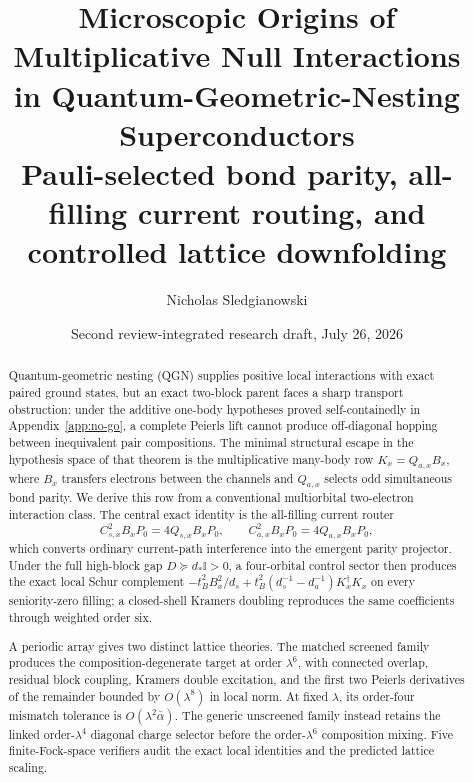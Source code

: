 \documentclass[11pt]{article}
\title{\textbf{Microscopic Origins of Multiplicative Null Interactions\\in Quantum-Geometric-Nesting Superconductors}\\[0.35em]
\large Pauli-selected bond parity, all-filling current routing, and controlled lattice downfolding}
\author{Nicholas Sledgianowski}
\date{Second review-integrated research draft, July 26, 2026}
\theoremstyle{definition}
\theoremstyle{remark}
\begin{document}
\maketitle

\begin{abstract}
Quantum-geometric nesting (QGN) supplies positive local interactions with exact paired ground states, but an exact two-block parent faces a sharp transport obstruction: under the additive one-body hypotheses proved self-containedly in Appendix~\ref{app:no-go}, a complete Peierls lift cannot produce off-diagonal hopping between inequivalent pair compositions.  The minimal structural escape in the hypothesis space of that theorem is the multiplicative many-body row $K_x=Q_{a,x}B_x$, where $B_x$ transfers electrons between the channels and $Q_{a,x}$ selects odd simultaneous bond parity.  We derive this row from a conventional multiorbital two-electron interaction class.  The central exact identity is the all-filling current router
\[
 C_{s,x}^{2}B_xP_0=4Q_{s,x}B_xP_0,
 \qquad
 C_{a,x}^{2}B_xP_0=4Q_{a,x}B_xP_0,
\]
which converts ordinary current-path interference into the emergent parity projector.  Under the full high-block gap $D\succeq d_*\mathbb I>0$, a four-orbital control sector then produces the exact local Schur complement $-t_B^2B_x^2/d_s+t_B^2(d_s^{-1}-d_a^{-1})K_x^\dagger K_x$ on every seniority-zero filling; a closed-shell Kramers doubling reproduces the same coefficients through weighted order six.

A periodic array gives two distinct lattice theories.  The matched screened family produces the composition-degenerate target at order $\lambda^6$, with connected overlap, residual block coupling, Kramers double excitation, and the first two Peierls derivatives of the remainder bounded by $O(\lambda^8)$ in local norm.  At fixed $\lambda$, its order-four mismatch tolerance is $O(\lambda^2\bar\alpha)$.  The generic unscreened family instead retains the linked order-$\lambda^4$ diagonal charge selector before the order-$\lambda^6$ composition mixing.  Five finite-Fock-space verifiers audit the exact local identities and the predicted lattice scaling.
\end{abstract}
\end{document}
